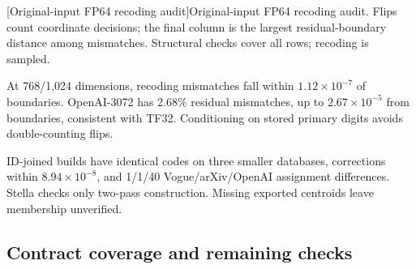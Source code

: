 \par\medskip\noindent\begin{minipage}{\linewidth}
\centering\captionsetup{hypcap=false}
[Original-input FP64 recoding audit]{Original-input FP64 recoding audit. Flips count coordinate
decisions; the final column is the largest residual-boundary distance
among mismatches. Structural checks cover all rows; recoding is sampled.}
\label{tab:4-representation-audit}
\scriptsize\setlength{\tabcolsep}{3pt}

\end{minipage}\par\medskip

At 768/1,024 dimensions, recoding mismatches fall within $1.12\times10^{-7}$ of boundaries. OpenAI-3072 has 2.68\% residual mismatches, up to $2.67\times10^{-5}$ from boundaries, consistent with TF32. Conditioning on stored primary digits avoids double-counting flips.

ID-joined builds have identical codes on three smaller databases, corrections within $8.94\times10^{-8}$, and 1/1/40 Vogue/arXiv/OpenAI assignment differences. Stella checks only two-pass construction. Missing exported centroids leave membership unverified.

\subsection{Contract coverage and remaining checks}
\suppressfloats[t]

